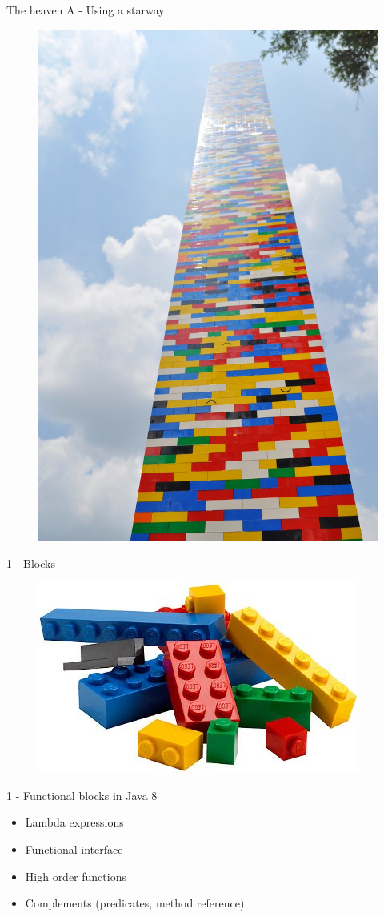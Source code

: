 \documentclass[14pt]{beamer}
\begin{document}
\begin{frame}{The heaven}
    \huge A - Using a starway
    \begin{figure}
        \centering
        \includegraphics[width=0.6\linewidth]{Images/starwaytoheaven}
    \end{figure}
\end{frame}

\begin{frame}{1 - Blocks}
    \begin{figure}
        \centering
        \includegraphics[width=0.9\linewidth]{Images/lego-parts}
    \end{figure}
\end{frame}

\begin{frame}{1 - Functional blocks in Java 8}
    \begin{itemize}
        \item Lambda expressions
        \item Functional interface
        \item High order functions
        \item Complements (predicates, method reference)
    \end{itemize}
\end{frame}
\end{document}
